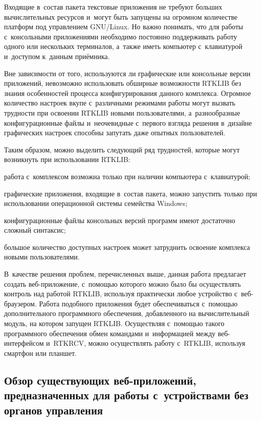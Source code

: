 Входящие в~состав пакета текстовые приложения не требуют больших вычислительных ресурсов и~могут быть запущены на огромном количестве платформ под управлением GNU/Linux. Но важно понимать, что для работы с~консольными приложениями необходимо постоянно поддерживать работу одного или нескольких терминалов, а~также иметь компьютер с~клавиатурой и~доступом к~данным приёмника. \par

Вне зависимости от того, используются ли графические или консольные версии приложений, невозможно использовать обширные возможности RTKLIB без знания особенностей процесса конфигурирования данного комплекса. Огромное количество настроек вкупе с~различными режимами работы могут вызвать трудности при освоении RTKLIB новыми пользователями, а~разнообразные конфигурационные файлы и~неочевидные с~первого взгляда решения в~дизайне графических настроек способны запутать даже опытных пользователей. \par

Таким образом, можно выделить следующий ряд трудностей, которые могут возникнуть при использовании RTKLIB:

\begin{dashitemize}
  \item работа с~комплексом возможна только при наличии компьютера с~клавиатурой;
  \item графические приложения, входящие в~состав пакета, можно запустить только при использовании операционной системы семейства Windows;
  \item конфигурационные файлы консольных версий программ имеют достаточно сложный синтаксис;
  \item большое количество доступных настроек может затруднить освоение комплекса новыми пользователями.
\end{dashitemize}

В~качестве решения проблем, перечисленных выше, данная работа предлагает создать веб-приложение, с~помощью которого можно было бы осуществлять контроль над работой RTKLIB, используя практически любое устройство с~веб-браузером. Работа подобного приложения будет обеспечиваться с~помощью дополнительного программного обеспечения, добавленного на вычислительный модуль, на котором запущен RTKLIB. Осуществляя с~помощью такого программного обеспечения обмен командами и~информацией между веб-интерфейсом и~RTKRCV, можно осуществлять работу с~RTKLIB, используя смартфон или планшет.

\subsection{Обзор существующих веб-приложений, предназначенных для работы с~устройствами без органов управления}

